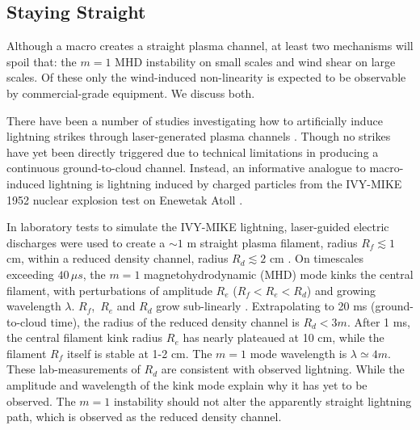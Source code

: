 \documentclass[%
 reprint,
 amsmath,amssymb,
 aps,
 nofootinbib, %
]{revtex4-2}
\begin{document}


    \subsection{Staying Straight} %
    \label{sub:staying_straight}

        Although a macro creates a straight plasma channel, at least two mechanisms will spoil that: the $m=1$ MHD instability on small scales and wind shear on large scales. Of these only the wind-induced non-linearity is expected to be observable by commercial-grade equipment. We discuss both.

        There have been a number of studies investigating how to artificially induce lightning strikes through laser-generated plasma channels \citep[see][]{Kasparian2008}. Though no strikes have yet been directly triggered due to technical limitations in producing a continuous ground-to-cloud channel. Instead, an informative analogue to macro-induced lightning is lightning induced by charged particles from the IVY-MIKE 1952 nuclear explosion test on Enewetak Atoll \citep{IVY-MIKE1987}.

        In laboratory tests to simulate the IVY-MIKE lightning, laser-guided electric discharges were used to create a ${\sim 1}$ m straight plasma filament, radius $R_f\lesssim 1$ cm, within a reduced density channel, radius $R_d \lesssim 2$ cm \citep[][fig. 6]{IVY-MIKE1987}. On timescales exceeding $40 \, \mu s$, the $m=1$ magnetohydrodynamic (MHD) mode kinks the central filament, with perturbations of amplitude $R_e$ ($R_f < R_e < R_d$) and growing wavelength $\lambda$. $R_f$,\, $R_e$ and $R_d$ grow sub-linearly \citep[][fig. 9]{IVY-MIKE1987}. Extrapolating to 20 ms (ground-to-cloud time), the radius of the reduced density channel is $R_d<3m$. After 1 ms, the central filament kink radius $R_e$ has nearly plateaued at 10 cm, while the filament $R_f$ itself is stable at 1-2 cm. The $m=1$ mode wavelength is $\lambda\simeq4 m$. These lab-measurements of $R_d$ are consistent with observed lightning. While the amplitude and wavelength of the kink mode explain why it has yet to be observed. The $m=1$ instability should not alter the apparently straight lightning path, which is observed as the reduced density channel.
\end{document}
